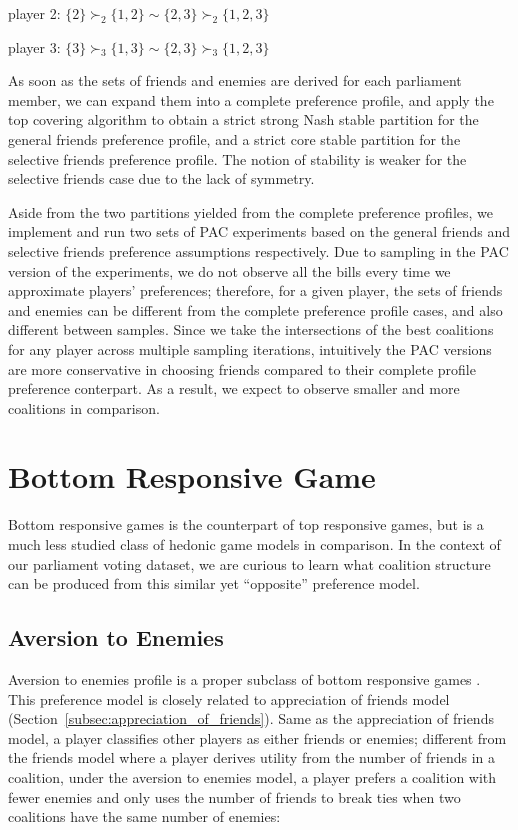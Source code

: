 player 2: $\{2\} \succ_2 \{1, 2\} \sim \{2, 3\} \succ_2 \{1, 2, 3\} $

player 3: $\{3\} \succ_3 \{1, 3\} \sim \{2, 3\} \succ_3 \{1, 2, 3\}$

As soon as the sets of friends and enemies are derived for each parliament member,
we can expand them into a complete preference profile, and apply the top covering
algorithm to obtain a strict strong Nash stable partition for the general friends
preference profile, and a strict core stable partition for the selective friends
preference profile. The notion of stability is weaker for the selective friends
case due to the lack of symmetry.

Aside from the two partitions yielded from the complete preference profiles,
we implement and run two sets of PAC experiments based on the general friends
and selective friends preference assumptions respectively.
Due to sampling in the PAC version of the experiments, we do not observe all
the bills every time we approximate players' preferences;
therefore, for a given player, the sets of friends and enemies can be different
from the complete preference profile cases, and also different between samples.
Since we take the intersections of the best coalitions for any player across
multiple sampling iterations, intuitively the PAC versions are more conservative
in choosing friends compared to their complete profile preference conterpart.
As a result, we expect to observe smaller and more coalitions in comparison.


\section{Bottom Responsive Game}
\label{sec:bottom_responsive_game}

Bottom responsive games is the counterpart of top responsive games, but is a
much less studied class of hedonic game models in comparison.
In the context of our parliament voting dataset, we are curious to learn what
coalition structure can be produced from this similar yet ``opposite''
preference model.

\subsection{Aversion to Enemies}
\label{subsec:aversion_to_enemies}

Aversion to enemies profile is a proper subclass of bottom responsive games
\cite{SuSu10}.
This preference model is closely related to appreciation of friends model
(Section~\ref{subsec:appreciation_of_friends}).
Same as the appreciation of friends model, a player classifies other players as
either friends or enemies; different from the friends model where a player
derives utility from the number of friends in a coalition, under the aversion
to enemies model, a player prefers a coalition with fewer enemies and only uses
the number of friends to break ties when two coalitions have the same number
of enemies:

